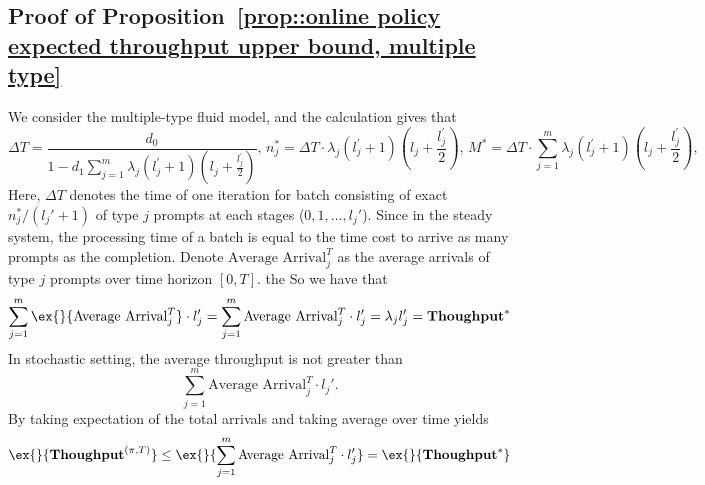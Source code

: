 \subsection{Proof of Proposition~\ref{prop::online policy expected throughput upper bound, multiple type}}\label{appendix::proof online policy expected throughput upper bound, multiple type}
We consider the multiple-type fluid model, and the calculation gives that
$$\Delta T = \frac{d_0}{ 1- d_1\sum_{j=1}^m \lambda_j(l_j^\prime+1)\left( l_j + \frac{l_j^\prime}{2} \right) },\,n_j^* = \Delta T\cdot \lambda_j(l_j^\prime+1)\left( l_j + \frac{l_j^\prime}{2} \right) ,\, M^* = \Delta T \cdot \sum_{j=1}^m \lambda_j(l_j^\prime+1)\left( l_j + \frac{l_j^\prime}{2} \right),\,$$
Here, $\Delta T$ denotes the time of one iteration for batch consisting of exact $n_j^*/(l_j'+1)$ of type $j$ prompts at each stages ($0,1,\dots,l_j'$). Since in the steady system, the processing time of a batch is equal to the time cost to arrive as many prompts as the completion. Denote $\text{Average Arrival}_j^T$ as the average arrivals of type $j$ prompts over time horizon $[0,T].$ the So we have that
$$\sum_{j=1}^m\ex{}{ \text{Average Arrival}_j^T }\cdot l_j'=  \sum_{j=1}^m\text{Average Arrival}_j^T \cdot l_j'= \lambda_jl_j' = \throughput^* $$
In stochastic setting, the average throughput is not greater than
\[ 
\sum_{j=1}^m\text{Average Arrival}_j^T \cdot l_j'.
\]
By taking expectation of the total arrivals and taking average over time yields 
$$\ex{}{\throughput^{(\pi,T)}}\leq \ex{}{\sum_{j=1}^m\text{Average Arrival}_j^T\cdot l_j'}=\ex{}{\throughput^*}  $$



